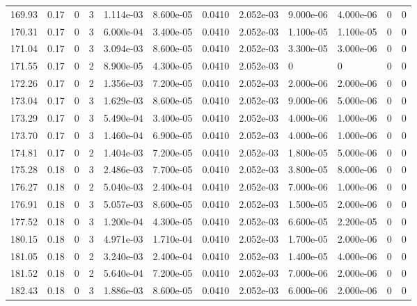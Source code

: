 \documentclass[preview]{standalone}
\begin{document}
{{{{{{{{\begin{tabular}{L{1.2cm}C{1.2cm} C{0.3cm}C{0.5cm} C{1.4cm}C{1.4cm} C{1.4cm}C{1.4cm} C{1.6cm}C{1.6cm} C{1.6cm}C{1.6cm}}
  169.93  &  0.17  & 0     &  3 &  1.114e-03  & 8.600e-05  &  0.0410&   2.052e-03& 9.000e-06 & 4.000e-06   &  0 & 0  \\ 
  170.31  &  0.17  & 0     &  3 &  6.000e-04  & 3.400e-05  &  0.0410&   2.052e-03& 1.100e-05 & 1.100e-05   &  0 & 0  \\ 
  171.04  &  0.17  & 0     &  3 &  3.094e-03  & 8.600e-05  &  0.0410&   2.052e-03& 3.300e-05 & 3.000e-06   &  0 & 0  \\ 
  171.55  &  0.17  & 0     &  2 &  8.900e-05  & 4.300e-05  &  0.0410&   2.052e-03& 0 & 0   &  0 & 0  \\ 
  172.26  &  0.17  & 0     &  2 &  1.356e-03  & 7.200e-05  &  0.0410&   2.052e-03& 2.000e-06 & 2.000e-06   &  0 & 0  \\ 
  173.04  &  0.17  & 0     &  3 &  1.629e-03  & 8.600e-05  &  0.0410&   2.052e-03& 9.000e-06 & 5.000e-06   &  0 & 0  \\ 
  173.29  &  0.17  & 0     &  3 &  5.490e-04  & 3.400e-05  &  0.0410&   2.052e-03& 4.000e-06 & 1.000e-06   &  0 & 0  \\ 
  173.70  &  0.17  & 0     &  3 &  1.460e-04  & 6.900e-05  &  0.0410&   2.052e-03& 4.000e-06 & 1.000e-06   &  0 & 0  \\ 
  174.81  &  0.17  & 0     &  2 &  1.404e-03  & 7.200e-05  &  0.0410&   2.052e-03& 1.800e-05 & 5.000e-06   &  0 & 0  \\ 
  175.28  &  0.18  & 0     &  3 &  2.486e-03  & 7.700e-05  &  0.0410&   2.052e-03& 3.800e-05 & 8.000e-06   &  0 & 0  \\ 
  176.27  &  0.18  & 0     &  2 &  5.040e-03  & 2.400e-04  &  0.0410&   2.052e-03& 7.000e-06 & 1.000e-06   &  0 & 0  \\ 
  176.91  &  0.18  & 0     &  3 &  5.057e-03  & 8.600e-05  &  0.0410&   2.052e-03& 1.500e-05 & 2.000e-06   &  0 & 0  \\ 
  177.52  &  0.18  & 0     &  3 &  1.200e-04  & 4.300e-05  &  0.0410&   2.052e-03& 6.600e-05 & 2.200e-05   &  0 & 0  \\ 
  180.15  &  0.18  & 0     &  3 &  4.971e-03  & 1.710e-04  &  0.0410&   2.052e-03& 1.700e-05 & 2.000e-06   &  0 & 0  \\ 
  181.05  &  0.18  & 0     &  2 &  3.240e-03  & 2.400e-04  &  0.0410&   2.052e-03& 1.400e-05 & 4.000e-06   &  0 & 0  \\ 
  181.52  &  0.18  & 0     &  2 &  5.640e-04  & 7.200e-05  &  0.0410&   2.052e-03& 7.000e-06 & 2.000e-06   &  0 & 0  \\ 
  182.43  &  0.18  & 0     &  3 &  1.886e-03  & 8.600e-05  &  0.0410&   2.052e-03& 6.000e-06 & 2.000e-06   &  0 & 0  \\ 

\end{tabular}}}}}}}}}
\end{document}
